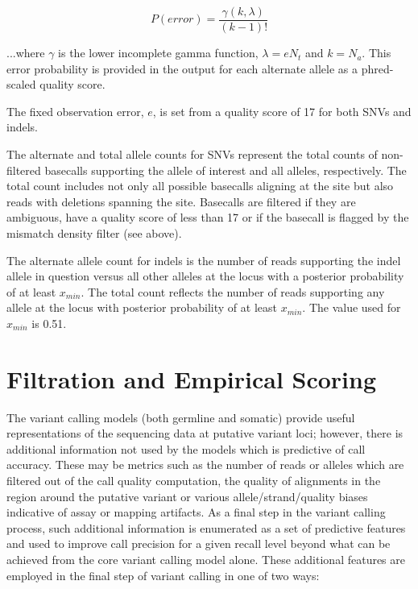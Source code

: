 \documentclass{article}
\begin{document}
\begin{equation*}
P(error) = \frac{\gamma(k,\lambda)}{(k-1)!}
\end{equation*}

...where $\gamma$ is the lower incomplete gamma function, $\lambda = e N_t$ and $k = N_a$. This error probability is provided in the output for each alternate allele as a phred-scaled quality score.

The fixed observation error, $e$, is set from a quality score of 17 for both SNVs and indels.

The alternate and total allele counts for SNVs represent the total counts of non-filtered basecalls supporting the allele of interest and all alleles, respectively. The total count includes not only all possible basecalls aligning at the site but also reads with deletions spanning the site. Basecalls are filtered if they are ambiguous, have a quality score of less than 17 or if the basecall is flagged by the mismatch density filter (see above).

The alternate allele count for indels is the number of reads supporting the indel allele in question versus all other alleles at the locus with a posterior probability of at least $x_{min}$. The total count reflects the number of reads supporting any allele at the locus with posterior probability of at least $x_{min}$. The value used for $x_{min}$ is 0.51.

\section{Filtration and Empirical Scoring}

The variant calling models (both germline and somatic) provide useful representations of the sequencing data at putative variant loci; however, there is additional information not used by the models which is predictive of call accuracy. These may be metrics such as the number of reads or alleles which are filtered out of the call quality computation, the quality of alignments in the region around the putative variant or various allele/strand/quality biases indicative of assay or mapping artifacts. As a final step in the variant calling process, such additional information is enumerated as a set of predictive features and used to improve call precision for a given recall level beyond what can be achieved from the core variant calling model alone. These additional features are employed in the final step of variant calling in one of two ways:
\end{document}
